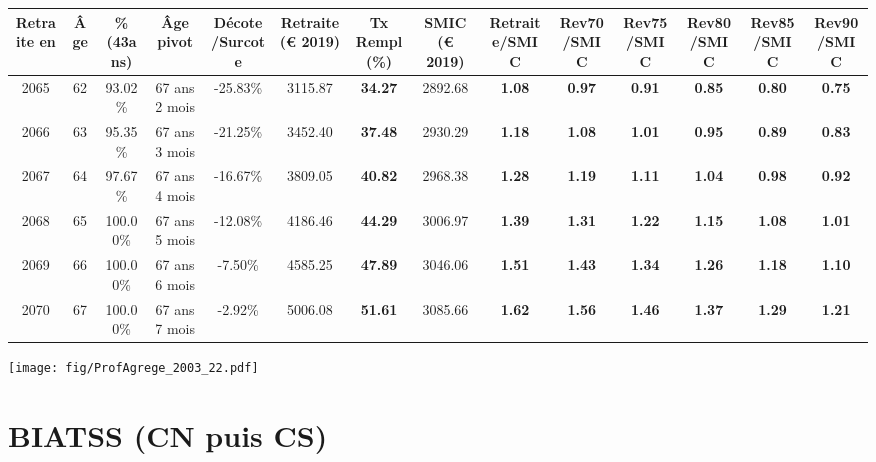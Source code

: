 \begin{adjustbox}{max width=\textwidth} 
\begin{tabular}[htb]{|c|c||c|c|c||c|c||c||c|c|c|c|c|c|} 
\hline 
 Retraite en &  Âge &  \%(43ans) &  Âge pivot &  Décote/Surcote &  Retraite (\euro{} 2019) &  Tx Rempl(\%) &  SMIC (\euro{} 2019) &  Retraite/SMIC &  Rev70/SMIC &  Rev75/SMIC &  Rev80/SMIC &  Rev85/SMIC &  Rev90/SMIC \\ 
\hline \hline 
 2065 &  62 &  93.02\% &  67 ans 2 mois &  -25.83\% &  3115.87 &  {\bf 34.27} &  2892.68 &  {\bf 1.08} &  {\bf {\color{red} 0.97}} &  {\bf {\color{red} 0.91}} &  {\bf {\color{red} 0.85}} &  {\bf {\color{red} 0.80}} &  {\bf {\color{red} 0.75}} \\ 
\hline 
 2066 &  63 &  95.35\% &  67 ans 3 mois &  -21.25\% &  3452.40 &  {\bf 37.48} &  2930.29 &  {\bf 1.18} &  {\bf 1.08} &  {\bf 1.01} &  {\bf {\color{red} 0.95}} &  {\bf {\color{red} 0.89}} &  {\bf {\color{red} 0.83}} \\ 
\hline 
 2067 &  64 &  97.67\% &  67 ans 4 mois &  -16.67\% &  3809.05 &  {\bf 40.82} &  2968.38 &  {\bf 1.28} &  {\bf 1.19} &  {\bf 1.11} &  {\bf 1.04} &  {\bf {\color{red} 0.98}} &  {\bf {\color{red} 0.92}} \\ 
\hline 
 2068 &  65 &  100.00\% &  67 ans 5 mois &  -12.08\% &  4186.46 &  {\bf 44.29} &  3006.97 &  {\bf 1.39} &  {\bf 1.31} &  {\bf 1.22} &  {\bf 1.15} &  {\bf 1.08} &  {\bf 1.01} \\ 
\hline 
 2069 &  66 &  100.00\% &  67 ans 6 mois &  -7.50\% &  4585.25 &  {\bf 47.89} &  3046.06 &  {\bf 1.51} &  {\bf 1.43} &  {\bf 1.34} &  {\bf 1.26} &  {\bf 1.18} &  {\bf 1.10} \\ 
\hline 
 2070 &  67 &  100.00\% &  67 ans 7 mois &  -2.92\% &  5006.08 &  {\bf 51.61} &  3085.66 &  {\bf 1.62} &  {\bf 1.56} &  {\bf 1.46} &  {\bf 1.37} &  {\bf 1.29} &  {\bf 1.21} \\ 
\hline 
\hline 
\end{tabular} 
\end{adjustbox} 
 
 \vspace{0.1cm} 

 \begin{center}\texttt{[image: fig/ProfAgrege\_2003\_22.pdf]}\end{center} \label{fig/ProfAgrege_2003_22.pdf} 

\newpage 
 
\chapter{BIATSS (CN puis CS)} 

